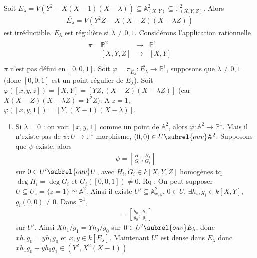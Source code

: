         \begin{expl}
            Soit $E_\lambda = V(Y^2 - X(X - 1)(X - \lambda)) \subseteq \mathbb{A}^2_{(X,Y)} \subseteq \mathbb{P}^2_{(X,Y,Z)}$. Alors
            \begin{align*}
                \overline{E_\lambda} = V(Y^2Z - X(X - Z)(X - \lambda Z))
            \end{align*}
            est irréductible. $E_\lambda$ est régulière si $\lambda \neq 0,1$. Considérons l'application rationnelle
            \begin{align*}
                \begin{array}{cccc}
                    \pi : & \mathbb{P}^2 & \to & \mathbb{P}^1 \\
                    & [X,Y,Z] & \mapsto & [X,Y] \\
                \end{array}
            \end{align*}
            $\pi$ n'est pas défini en $[0,0,1]$. Soit $\varphi = \pi_{\overline{E_\lambda}} : \overline{E_\lambda} \to \mathbb{P}^1$, supposons que $\lambda \neq 0,1$ (donc $[0,0,1]$ est un point régulier de $\overline{E_\lambda}$). Soit $\varphi([x,y,z]) = [X,Y] = [YZ, (X - Z)(X - \lambda Z)]$ (car $X(X - Z)(X - \lambda Z) = Y^2Z$). A $z = 1$, $\varphi([x,y,1]) = [Y, (X - 1)(X - \lambda)]$.
            \begin{enumerate}
                \item Si $\lambda = 0$ : on voit $[x,y,1]$ comme un point de $\mathbb{A}^2$, alors $\varphi : \mathbb{A}^2 \to \mathbb{P}^1$. Mais il n'existe pas de $\psi : U \to \mathbb{P}^1$ morphisme, $(0,0) \in U \subrel{ouv} \mathbb{A}^2$. Supposons que $\psi$ existe, alors
                \begin{align*}
                    \psi = \left[ \frac{H_0}{G_0}, \frac{H_1}{G_1} \right]
                \end{align*}
                sur $0 \in U' \subrel{ouv} U$, avec $H_i, G_i \in k[X,Y,Z]$ homogènes tq $\deg H_i = \deg G_i$ et $G_i([0,0,1]) \neq 0$. Rq : On peut supposer $U \subseteq U_z = \{z = 1\} \simeq \mathbb{A}^2$. Ainsi il existe $U' \subseteq \mathbb{A}^2_{x,y}$, $0 \in U$, $\exists h_i,g_i \in k[X,Y]$, $g_i(0,0) \neq 0$. Dans $\mathbb{P}^1$,
                \begin{align*}
                    [X,Y] = \left[ \frac{h_0}{g_0}, \frac{h_1}{g_1} \right]
                \end{align*}
                sur $U'$. Ainsi $Xh_1/g_1 = Yh_0/g_0$ sur $0 \in U' \subrel{ouv} E_{\lambda}$, donc $xh_1g_0 = yh_1g_0$ et $x,y \in k[E_\lambda]$. Maintenant $U'$ est dense dans $E_\lambda$ donc $xh_1g_0 - yh_0g_1 \in (Y^2, X^2(X - 1))$

\end{enumerate}
\end{expl}
